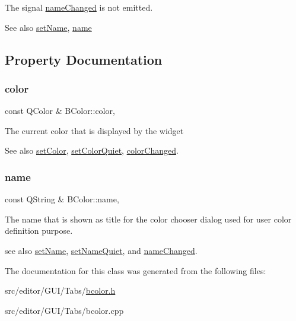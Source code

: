 The signal \hyperlink{class_b_color_a5895b999f69044b919e6d5526577ad87}{name\+Changed} is not emitted.

\begin{DoxySeeAlso}{See also}
\hyperlink{class_b_color_abcf2d57696ada6466424663f15624cad}{set\+Name}, \hyperlink{class_b_color_a68e6b6c8c92fe004a98b44d48ba8a42a}{name} 
\end{DoxySeeAlso}


\subsection{Property Documentation}
\hypertarget{class_b_color_af5d46ba62e3868ab618269dff46d5718}{}\label{class_b_color_af5d46ba62e3868ab618269dff46d5718} 
\subsubsection{\texorpdfstring{color}{color}}
{\footnotesize\ttfamily const Q\+Color \& B\+Color\+::color\hspace{0.3cm}{\ttfamily [read]}, {\ttfamily [write]}}

The current color that is displayed by the widget

\begin{DoxySeeAlso}{See also}
\hyperlink{class_b_color_a901e6704aef22f6db97d3578e14777c6}{set\+Color}, \hyperlink{class_b_color_a3781c2b986f19ceaac7c994767015b56}{set\+Color\+Quiet}, \hyperlink{class_b_color_a75ac94fde91e10eb6c27242f608b8d62}{color\+Changed}. 
\end{DoxySeeAlso}
\hypertarget{class_b_color_a68e6b6c8c92fe004a98b44d48ba8a42a}{}\label{class_b_color_a68e6b6c8c92fe004a98b44d48ba8a42a} 
\subsubsection{\texorpdfstring{name}{name}}
{\footnotesize\ttfamily const Q\+String \& B\+Color\+::name\hspace{0.3cm}{\ttfamily [read]}, {\ttfamily [write]}}

The name that is shown as title for the color chooser dialog used for user color definition purpose.

see also \hyperlink{class_b_color_abcf2d57696ada6466424663f15624cad}{set\+Name}, \hyperlink{class_b_color_ac159569b670ed175be068204a28a7be9}{set\+Name\+Quiet}, and \hyperlink{class_b_color_a5895b999f69044b919e6d5526577ad87}{name\+Changed}. 

The documentation for this class was generated from the following files\+:\begin{DoxyCompactItemize}
\item 
src/editor/\+G\+U\+I/\+Tabs/\hyperlink{bcolor_8h}{bcolor.\+h}\item 
src/editor/\+G\+U\+I/\+Tabs/bcolor.\+cpp\end{DoxyCompactItemize}
